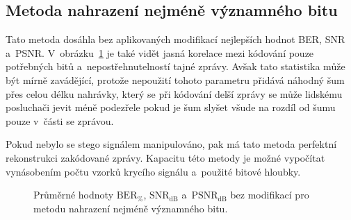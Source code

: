 \subsection*{Metoda nahrazení nejméně významného bitu}

Tato metoda dosáhla bez aplikovaných modifikací nejlepších hodnot BER, SNR
a~PSNR. V~obrázku~\ref{pic:no-mod-params-mean-values-lsb} je také vidět jasná
korelace mezi kódování pouze potřebných bitů a~nepostřehnutelností tajné
zprávy. Avšak tato statistika může být mírně zavádějící, protože nepoužití
tohoto parametru přidává náhodný šum přes celou délku nahrávky, který se při
kódování delší zprávy se může lidskému posluchači jevit méně podezřele pokud je
šum slyšet všude na rozdíl od šumu pouze v~části se zprávou.

Pokud nebylo se stego signálem manipulováno, pak má tato metoda perfektní
rekonstrukci zakódované zprávy. Kapacitu této metody je možné vypočítat
vynásobením počtu vzorků krycího signálu a~použité bitové hloubky.

\begin{figure}[hbt]
    \table
    \centering
    \caption{Průměrné hodnoty $\mathrm{BER}_{\%}$, $\mathrm{SNR}_\mathrm{dB}$
    a~$\mathrm{PSNR}_\mathrm{dB}$ bez modifikací pro metodu nahrazení nejméně
    významného bitu.}
    \label{pic:no-mod-params-mean-values-lsb}
\end{figure}


